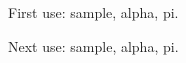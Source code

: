\documentclass[12pt]{article}
\begin{document}
First use: \gls{sample}, \gls{alpha}, \gls{pi}. 

Next use: \gls{sample}, \gls{alpha}, \gls{pi}. 
\end{document}
